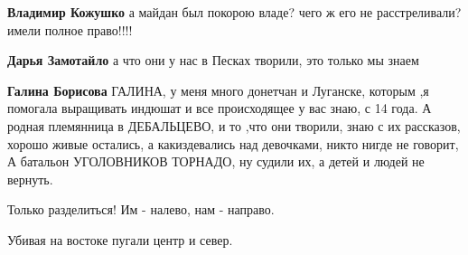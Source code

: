 \begin{itemize}
\begin{itemize}
 
\textbf{Владимир Кожушко} а майдан был покорою владе? чего ж его не расстреливали? имели полное право!!!!

 
\textbf{Дарья Замотайло} а что они у нас в Песках творили, это только мы знаем

 
\textbf{Галина Борисова} ГАЛИНА, у меня много донетчан и Луганске, которым ,я
помогала выращивать индюшат и все происходящее у вас знаю, с 14 года. А родная
племянница в ДЕБАЛЬЦЕВО, и то ,что они творили, знаю с их рассказов, хорошо
живые остались, а какиздевались над девочками, никто нигде не говорит, А
батальон УГОЛОВНИКОВ ТОРНАДО, ну судили их, а детей и людей не вернуть.

\end{itemize}

 
Только разделиться!
Им - налево, нам - направо.

 
Убивая на востоке пугали центр и север.

 

\end{itemize}
